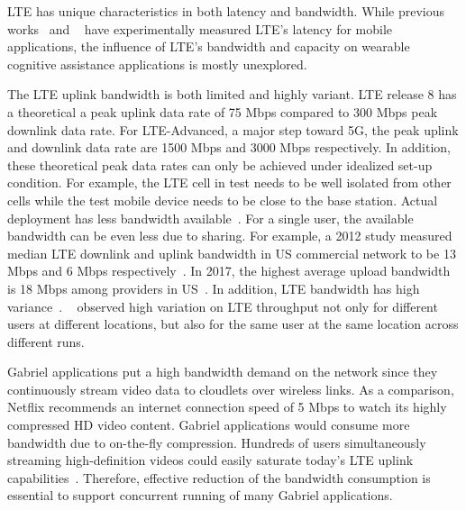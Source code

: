 LTE has unique characteristics in both latency and bandwidth. While previous
works~\cite{hu2016quantifying} and ~\cite{hadvzic2017edge} have experimentally
measured LTE's latency for mobile applications, the influence of LTE's bandwidth
and capacity on wearable cognitive assistance applications is mostly
unexplored.

The LTE uplink bandwidth is both limited and highly variant. LTE release 8 has a
theoretical a peak uplink data rate of 75 Mbps compared to 300 Mbps peak
downlink data rate. For LTE-Advanced, a major step toward 5G, the peak uplink
and downlink data rate are 1500 Mbps and 3000 Mbps respectively. In addition,
these theoretical peak data rates can only be achieved under idealized set-up
condition. For example, the LTE cell in test needs to be well isolated from
other cells while the test mobile device needs to be close to the base station.
Actual deployment has less bandwidth available~\cite{cox2012introduction}. For a
single user, the available bandwidth can be even less due to sharing. For
example, a 2012 study measured median LTE downlink and uplink bandwidth in US
commercial network to be 13 Mbps and 6 Mbps respectively~\cite{huang2012close}.
In 2017, the highest average upload bandwidth is 18 Mbps among providers in
US~\cite{PCMag2017}. In addition, LTE bandwidth has high
variance~\cite{winstein2013stochastic}. ~\cite{huang2012close} observed high
variation on LTE throughput not only for different users at different locations,
but also for the same user at the same location across different runs.

Gabriel applications put a high bandwidth demand on the network since they
continuously stream video data to cloudlets over wireless links. As a
comparison, Netflix recommends an internet connection speed of 5 Mbps to watch
its highly compressed HD video content. Gabriel applications would consume more
bandwidth due to on-the-fly compression. Hundreds of users simultaneously
streaming high-definition videos could easily saturate today's LTE uplink
capabilities~\cite{oyman2010toward}. Therefore, effective reduction of the
bandwidth consumption is essential to support concurrent running of many Gabriel
applications.

